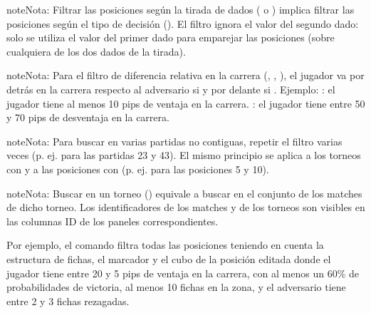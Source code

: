 \documentclass[letterpaper,10pt,spanish]{sphinxmanual}
\begin{document}
\begin{sphinxadmonition}{note}{Nota:}
\sphinxAtStartPar
Filtrar las posiciones según la tirada de dados ( o ) implica  filtrar las posiciones según el tipo de decisión (). El filtro  ignora el valor del segundo dado: solo se utiliza el valor del primer dado para emparejar las posiciones (sobre cualquiera de los dos dados de la tirada).
\end{sphinxadmonition}

\begin{sphinxadmonition}{note}{Nota:}
\sphinxAtStartPar
Para el filtro de diferencia relativa en la carrera (, , ), el jugador va por detrás en la carrera respecto al adversario si  y por delante si . Ejemplo:  : el jugador tiene al menos 10 pips de ventaja en la carrera.  : el jugador tiene entre 50 y 70 pips de desventaja en la carrera.
\end{sphinxadmonition}

\begin{sphinxadmonition}{note}{Nota:}
\sphinxAtStartPar
Para buscar en varias partidas no contiguas, repetir el filtro  varias veces (p. ej.  para las partidas 23 y 43). El mismo principio se aplica a los torneos con  y a las posiciones con  (p. ej.  para las posiciones 5 y 10).
\end{sphinxadmonition}

\begin{sphinxadmonition}{note}{Nota:}
\sphinxAtStartPar
Buscar en un torneo () equivale a buscar en el conjunto de los matches de dicho torneo. Los identificadores de los matches y de los torneos son visibles en las columnas ID de los paneles correspondientes.
\end{sphinxadmonition}

\sphinxAtStartPar
Por ejemplo, el comando  filtra todas las posiciones teniendo en cuenta la estructura de fichas, el marcador y el cubo de la posición editada donde el jugador tiene entre 20 y 5 pips de ventaja en la carrera, con al menos un 60\% de probabilidades de victoria, al menos 10 fichas en la zona, y el adversario tiene entre 2 y 3 fichas rezagadas.
\end{document}
